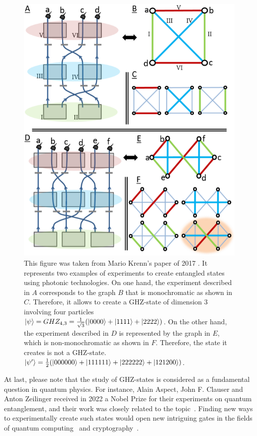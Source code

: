 \begin{figure}[H]
    \centering
    \includegraphics[scale=0.7]{figures/problem_presentation/motivations/krenn_graph}
    \caption{This figure was taken from Mario Krenn's paper of 2017 \cite{Krenn_2017}.
        It represents two examples of experiments to create entangled states using photonic technologies.
        On one hand, the experiment described in $A$ corresponds to the graph $B$ that is monochromatic as shown in $C$.
        Therefore, it allows to create a GHZ-state of dimension 3 involving four particles $\ket{\psi} = GHZ_{4, 3} = \frac{1}{\sqrt{3}} (\ket{0000} + \ket{1111} + \ket{2222})$.
        On the other hand, the experiment described in $D$ is represented by the graph in $E$, which is non-monochromatic as shown in $F$.
        Therefore, the state it creates is not a GHZ-state.
        $\ket{\psi'} = \frac{1}{2} (\ket{000000} + \ket{111111} + \ket{222222} + \ket{121200})$.}
    \label{fig:krenn_experiment}
\end{figure}

At last, please note that the study of GHZ-states is considered as a fundamental question in quantum physics.
For instance, Alain Aspect, John F. Clauser and Anton Zeilinger received in 2022 a Nobel Prize for their experiments on quantum entanglement, and their work was closely related to the topic~\cite{nobelprizeNobelPrize}.
Finding new ways to experimentally create such states would open new intriguing gates in the fields of quantum computing~\cite{gu2020compact} and cryptography~\cite{pivoluska2018layered}.\\
